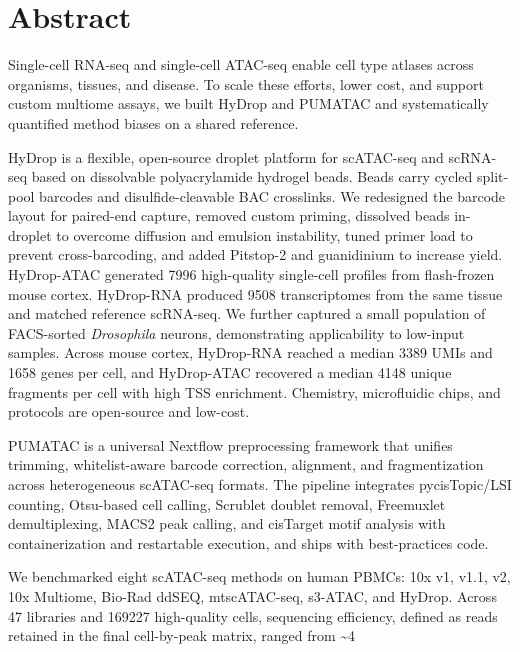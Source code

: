 \chapter*{Abstract}
Single-cell RNA-seq and single-cell ATAC-seq enable cell type atlases across organisms, tissues, and disease. To scale these efforts, lower cost, and support custom multiome assays, we built HyDrop and PUMATAC and systematically quantified method biases on a shared reference.

HyDrop is a flexible, open-source droplet platform for scATAC-seq and scRNA-seq based on dissolvable polyacrylamide hydrogel beads. Beads carry cycled split-pool barcodes and disulfide-cleavable BAC crosslinks. We redesigned the barcode layout for paired-end capture, removed custom priming, dissolved beads in-droplet to overcome diffusion and emulsion instability, tuned primer load to prevent cross-barcoding, and added Pitstop-2 and guanidinium to increase yield. HyDrop-ATAC generated \num{7996} high-quality single-cell profiles from flash-frozen mouse cortex. HyDrop-RNA produced \num{9508} transcriptomes from the same tissue and matched reference scRNA-seq. We further captured a small population of FACS-sorted \textit{Drosophila} neurons, demonstrating applicability to low-input samples. Across mouse cortex, HyDrop-RNA reached a median \num{3389} UMIs and \num{1658} genes per cell, and HyDrop-ATAC recovered a median \num{4148} unique fragments per cell with high TSS enrichment. Chemistry, microfluidic chips, and protocols are open-source and low-cost.

PUMATAC is a universal Nextflow preprocessing framework that unifies trimming, whitelist-aware barcode correction, alignment, and fragmentization across heterogeneous scATAC-seq formats. The pipeline integrates pycisTopic/LSI counting, Otsu-based cell calling, Scrublet doublet removal, Freemuxlet demultiplexing, MACS2 peak calling, and cisTarget motif analysis with containerization and restartable execution, and ships with best-practices code.

We benchmarked eight scATAC-seq methods on human PBMCs: 10x v1, v1.1, v2, 10x Multiome, Bio-Rad ddSEQ, mtscATAC-seq, s3-ATAC, and HyDrop. Across \num{47} libraries and \num{169227} high-quality cells, sequencing efficiency, defined as reads retained in the final cell-by-peak matrix, ranged from \textasciitilde\num{4}%

